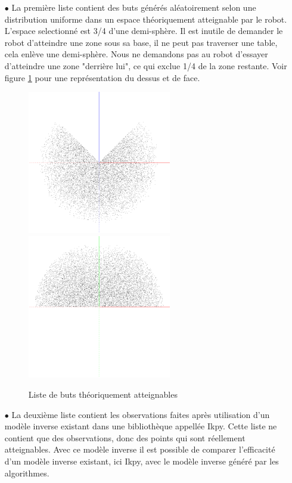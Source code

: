 \documentclass[11pt,french]{report}
\begin{document}
\begin{itemize}
    \item[$\bullet$] La première liste contient des buts générés aléatoirement selon une distribution uniforme dans un espace théoriquement atteignable par le robot.
    L'espace selectionné est 3/4 d'une demi-sphère.
    Il est inutile de demander le robot d'atteindre une zone sous sa base, il ne peut pas traverser une table, cela enlève une demi-sphère.
    Nous ne demandons pas au robot d'essayer d'atteindre une zone "derrière lui", ce qui exclue 1/4 de la zone restante.
    Voir figure \ref{fig:goal_list} pour une représentation du dessus et de face.
    
    \begin{figure}
        \centering
        \includegraphics[width=178pt]{goal_list_top} \includegraphics[width=178pt]{goal_list_front}
        \caption{Liste de buts théoriquement atteignables}
        \label{fig:goal_list}
    \end{figure}
    
    \item[$\bullet$] La deuxième liste contient les observations faites après utilisation d'un modèle inverse existant dans une bibliothèque appellée Ikpy.
    Cette liste ne contient que des observations, donc des points qui sont réellement atteignables.
    Avec ce modèle inverse il est possible de comparer l'efficacité d'un modèle inverse existant, ici Ikpy, avec le modèle inverse généré par les algorithmes.
\end{itemize}
\end{document}
